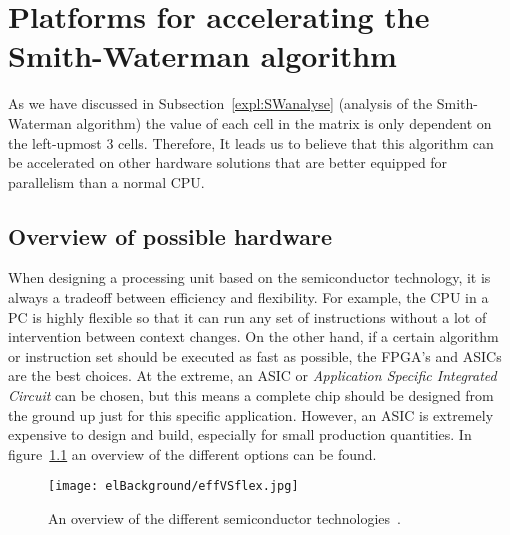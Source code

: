
\chapter{Platforms for accelerating the Smith-Waterman algorithm}
\label{ch:Platforms}

As we have discussed in Subsection~\ref{expl:SWanalyse} (analysis of the Smith-Waterman algorithm) the value of each cell in the matrix is only dependent on the left-upmost 3 cells. Therefore, It leads us to believe that this algorithm can be accelerated on other hardware solutions that are better equipped for parallelism than a normal CPU.

\section{Overview of possible hardware}

When designing a processing unit based on the semiconductor technology, it is always a tradeoff between efficiency and flexibility. For example, the CPU in a PC is highly flexible so that it can run any set of instructions without a lot of intervention between context changes. On the other hand, if a certain algorithm or instruction set should be executed as fast as possible, the FPGA's and ASICs are the best choices. At the extreme, an ASIC or \emph{Application Specific Integrated Circuit} can be chosen, but this means a complete chip should be designed from the ground up just for this specific application. However, an ASIC is extremely expensive to design and build, especially for small production quantities. In figure~\ref{fig:effVSflex} an overview of the different options can be found.

\begin{figure}[H]
	\centering
	\texttt{[image: elBackground/effVSflex.jpg]}
	\caption{An overview of the different semiconductor technologies~\cite{fpgacomparison}.}
	\label{fig:effVSflex}
\end{figure}

